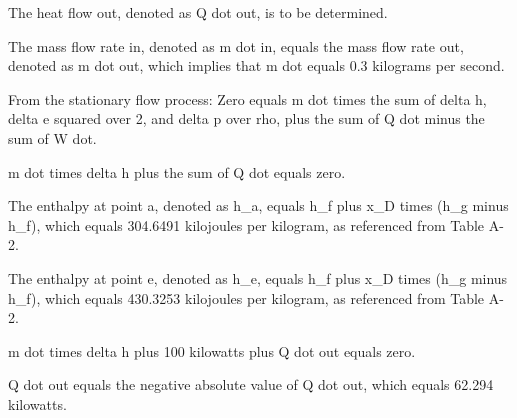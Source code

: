 The heat flow out, denoted as Q dot out, is to be determined.

The mass flow rate in, denoted as m dot in, equals the mass flow rate out, denoted as m dot out, which implies that m dot equals 0.3 kilograms per second.

From the stationary flow process:
Zero equals m dot times the sum of delta h, delta e squared over 2, and delta p over rho, plus the sum of Q dot minus the sum of W dot.

m dot times delta h plus the sum of Q dot equals zero.

The enthalpy at point a, denoted as h_a, equals h_f plus x_D times (h_g minus h_f), which equals 304.6491 kilojoules per kilogram, as referenced from Table A-2.

The enthalpy at point e, denoted as h_e, equals h_f plus x_D times (h_g minus h_f), which equals 430.3253 kilojoules per kilogram, as referenced from Table A-2.

m dot times delta h plus 100 kilowatts plus Q dot out equals zero.

Q dot out equals the negative absolute value of Q dot out, which equals 62.294 kilowatts.